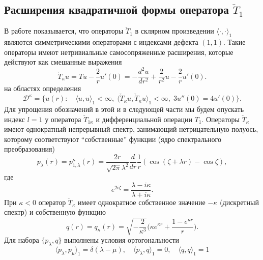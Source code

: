 \documentclass[12pt]{article}
\newcommand{\DD}{\mathcal{D}}
\begin{document}
\subsection{Расширения квадратичной формы оператора
$ \check{T}_{1} $}
    В работе
\cite{Inv}
    показывается, что операторы
$ \check{T}_{1} $
    в склярном произведении
$ \langle \cdot , \cdot \rangle_{1} $
    являются симметрическими операторами с индексами дефекта
$ (1,1) $.
    Такие операторы имеют нетривиальные самосопряженные расширения,
    которые действуют как смешанные выражения
\begin{equation*}
    \check{T}_{\kappa} u = T u - \frac{2}{r} u'(0)
    = -\frac{d^{2}u}{dr^{2}} + \frac{2}{r^{2}} u -\frac{2}{r}u'(0) .
\end{equation*}
    на областях определения
\begin{equation}
\label{cTb}
    \DD^{\kappa} = \{u(r): \quad \langle u,u\rangle_{1} < \infty, \;
	\langle \check{T}_{\kappa} u, \check{T}_{\kappa} u\rangle_{1} <\infty,
	\; 3u''(0) = 4u'(0) \} .
\end{equation}
    Для упрощения обозначений в этой и в следующей части
    мы будем опускать индекс
$ l=1 $
    у оператора
$ \check{T}_{1\kappa} $
    и дифференциальной операции
$ T_{1} $.
    Операторы
$ \check{T}_{\kappa} $
    имеют однократный непрерывный спектр, занимающий нетрицательную полуось,
    которому соответствуют ``собственные'' функции (ядро спектрального
    преобразования)
\begin{equation*}
\label{Tpl}
    p_{\lambda}(r) = p_{1,\lambda}^{\kappa}(r)
        = \frac{2r}{\sqrt{2\pi}\lambda^{2}} \frac{d}{dr}\frac{1}{r}
    (\cos(\zeta +\lambda r) - \cos\zeta) ,
\end{equation*}
    где
\begin{equation*}
    e^{2i\zeta} = \frac{\lambda - i\kappa}{\lambda + i\kappa}.
\end{equation*}
    При
$ \kappa < 0 $
    оператор
$ \check{T}_{\kappa} $
    имеет однократное собственное значение
$ -\kappa $
    (дискретный спектр) и собственную функцию
\begin{equation*}
    q(r) = q_{\kappa}(r)
    = \sqrt{-\frac{2}{\kappa^{3}}}
        \bigl(\kappa e^{\kappa r} + \frac{1-e^{\kappa r}}{r}\bigr) .
\end{equation*}
    Для набора
$ \{p_{\lambda}, q \} $
    выполнены условия ортогональности
\begin{equation*}
    \langle p_{\lambda} , p_{\mu} \rangle_{1} = \delta(\lambda-\mu) ,
    \quad \langle p_{\lambda} , q \rangle_{1} = 0 ,
    \quad \langle q , q \rangle_{1} = 1
\end{equation*}
\end{document}
